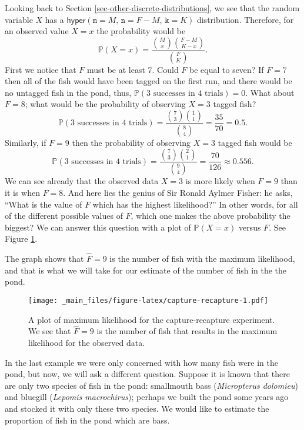 \documentclass[]{book}
\numberwithin{equation}{chapter}
\numberwithin{figure}{chapter}
\theoremstyle{plain}
\theoremstyle{definition}
\theoremstyle{remark}
\theoremstyle{definition}
\theoremstyle{definition}
\theoremstyle{remark}
\let\BeginKnitrBlock\begin \let\EndKnitrBlock\end
\begin{document}
Looking back to Section \ref{sec-other-discrete-distributions}, we see
that the random variable \(X\) has a
\(\mathsf{hyper}(\mathtt{m}=M,\,\mathtt{n}=F-M,\,\mathtt{k}=K)\)
distribution. Therefore, for an observed value \(X=x\) the probability
would be \[ \mathbb{P}(X=x)=\frac{{M \choose x}{F-M \choose K-x}}{{F
\choose K}}.  \] First we notice that \(F\) must be at least 7. Could
\(F\) be equal to seven? If \(F=7\) then all of the fish would have been
tagged on the first run, and there would be no untagged fish in the
pond, thus, \(\mathbb{P}(\mbox{3 successes in 4 trials})=0\). What about
\(F=8\); what would be the probability of observing \(X=3\) tagged fish?
\[ \mathbb{P}(\mbox{3 successes in 4 trials})=\frac{{7
\choose 3}{1 \choose 1}}{{8 \choose 4}}=\frac{35}{70}=0.5.  \]
Similarly, if \(F=9\) then the probability of observing \(X=3\) tagged
fish would be \[ \mathbb{P}(\mbox{3 successes in 4 trials})=\frac{{7
\choose 3}{2 \choose 1}}{{9 \choose 4}}=\frac{70}{126}\approx0.556.
\] We can see already that the observed data \(X=3\) is more likely when
\(F=9\) than it is when \(F=8\). And here lies the genius of Sir Ronald
Aylmer Fisher: he asks, ``What is the value of \(F\) which has the
highest likelihood?'' In other words, for all of the different possible
values of \(F\), which one makes the above probability the biggest? We
can answer this question with a plot of \(\mathbb{P}(X=x)\) versus
\(F\). See Figure \ref{fig:capture-recapture}.

The graph shows that \(\hat{F}=9\) is the number of fish with the
maximum likelihood, and that is what we will take for our estimate of
the number of fish in the the pond.

\begin{figure}[htbp]
\centering
\texttt{[image: \_main\_files/figure-latex/capture-recapture-1.pdf]}
\caption{\label{fig:capture-recapture}\small A plot of maximum likelihood for the
capture-recapture experiment. We see that \(\hat{F}=9\) is the number of
fish that results in the maximum likelihood for the observed data.}
\end{figure}





\bigskip

\BeginKnitrBlock{example}[Fishing, part two]
\protect\hypertarget{ex:bass-bluegill}{}{\label{ex:bass-bluegill}
\iffalse (Fishing, part two) \fi }In the last example we were only
concerned with how many fish were in the pond, but now, we will ask a
different question. Suppose it is known that there are only two species
of fish in the pond: smallmouth bass (\emph{Micropterus dolomieu}) and
bluegill (\emph{Lepomis macrochirus}); perhaps we built the pond some
years ago and stocked it with only these two species. We would like to
estimate the proportion of fish in the pond which are bass.
\EndKnitrBlock{example}
\end{document}
